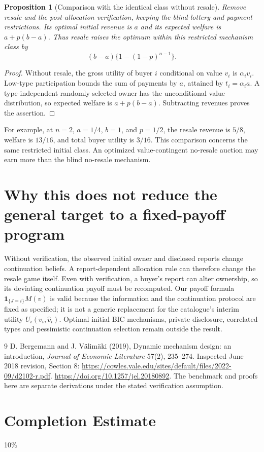 \documentclass[11pt]{article}
\newtheorem{proposition}[theorem]{Proposition}
\theoremstyle{definition}
\theoremstyle{remark}
\begin{document}
\begin{proposition}[Comparison with the identical class without resale]
Remove resale and the post-allocation verification, keeping the blind-lottery and payment restrictions. Its optimal initial revenue is $a$ and its expected welfare is $a+p(b-a)$. Thus resale raises the optimum within this restricted mechanism class by
\[
 (b-a)\{1-(1-p)^{n-1}\}.
\]
\end{proposition}
\begin{proof}
Without resale, the gross utility of buyer $i$ conditional on value $v_i$ is $\alpha_i v_i$. Low-type participation bounds the sum of payments by $a$, attained by $t_i=\alpha_i a$. A type-independent randomly selected owner has the unconditional value distribution, so expected welfare is $a+p(b-a)$. Subtracting revenues proves the assertion.
\end{proof}

For example, at $n=2$, $a=1/4$, $b=1$, and $p=1/2$, the resale revenue is $5/8$, welfare is $13/16$, and total buyer utility is $3/16$. This comparison concerns the same restricted initial class. An optimized value-contingent no-resale auction may earn more than the blind no-resale mechanism.

\section{Why this does not reduce the general target to a fixed-payoff program}
Without verification, the observed initial owner and disclosed reports change continuation beliefs. A report-dependent allocation rule can therefore change the resale game itself. Even with verification, a buyer's report can alter ownership, so its deviating continuation payoff must be recomputed. Our payoff formula $\mathbf1_{\{J=i\}}M(v)$ is valid because the information and the continuation protocol are fixed as specified; it is not a generic replacement for the catalogue's interim utility $U_i(v_i,\widehat v_i)$. Optimal initial BIC mechanisms, private disclosure, correlated types and pessimistic continuation selection remain outside the result.

\begin{thebibliography}{9}
 D. Bergemann and J. V\"alim\"aki (2019), Dynamic mechanism design: an introduction, \emph{Journal of Economic Literature} 57(2), 235--274. Inspected June 2018 revision, Section 8: \url{https://cowles.yale.edu/sites/default/files/2022-09/d2102-r.pdf}. \url{https://doi.org/10.1257/jel.20180892}. The benchmark and proofs here are separate derivations under the stated verification assumption.
\end{thebibliography}
\section{Completion Estimate}
10\%
\end{document}
